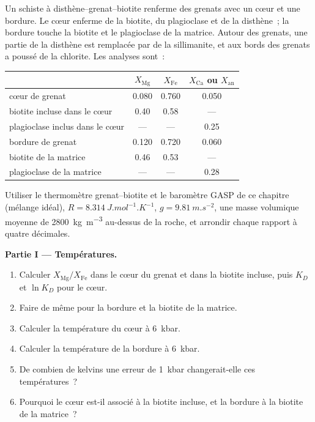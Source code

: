 \begin{problem}
\label{pb:b2:pt-paths:1}
Un schiste à disthène--grenat--biotite renferme des grenats avec un cœur et une bordure. Le cœur enferme
de la biotite, du plagioclase et de la disthène~; la bordure touche la biotite et le plagioclase de la
matrice. Autour des grenats, une partie de la disthène est remplacée par de la sillimanite, et aux bords des grenats
a poussé de la chlorite. Les analyses sont~:
\begin{center}
\small
\begin{tabular}{@{}lccc@{}}
\hline
& $X_{\text{Mg}}$ & $X_{\text{Fe}}$ & $X_{\text{Ca}}$ ou $X_{\text{an}}$\\
\hline
cœur de grenat & 0.080 & 0.760 & 0.050\\
biotite incluse dans le cœur & 0.40 & 0.58 & ---\\
plagioclase inclus dans le cœur & --- & --- & 0.25\\
bordure de grenat & 0.120 & 0.720 & 0.060\\
biotite de la matrice & 0.46 & 0.53 & ---\\
plagioclase de la matrice & --- & --- & 0.28\\
\hline
\end{tabular}
\end{center}
Utiliser le thermomètre grenat--biotite et le baromètre GASP de ce chapitre (mélange idéal),
$R = \qty{8.314}{J.mol^{-1}.K^{-1}}$, $g = \qty{9.81}{m.s^{-2}}$, une masse volumique moyenne de
\qty{2800}{kg.m^{-3}} au-dessus de la roche, et arrondir chaque rapport à quatre décimales.

\noindent\textbf{Partie I --- Températures.}
\begin{enumerate}
\item Calculer $X_{\text{Mg}}/X_{\text{Fe}}$ dans le cœur du grenat et dans la biotite incluse,
puis $K_D$ et $\ln K_D$ pour le cœur.
\item Faire de même pour la bordure et la biotite de la matrice.
\item Calculer la température du cœur à \qty{6}{kbar}.
\item Calculer la température de la bordure à \qty{6}{kbar}.
\item De combien de kelvins une erreur de \qty{1}{kbar} changerait-elle ces températures~?
\item Pourquoi le cœur est-il associé à la biotite incluse, et la bordure à la biotite de la
matrice~?
\end{enumerate}


\end{problem}

